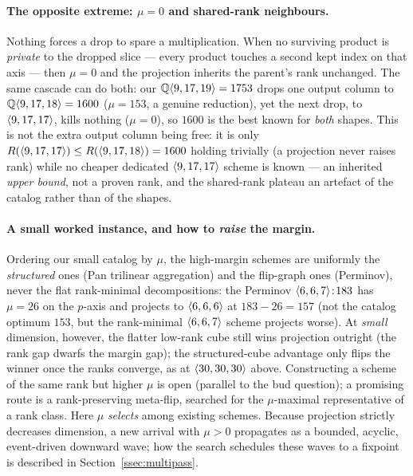 \paragraph{The opposite extreme: \(\mu=0\) and shared-rank neighbours.} Nothing forces a
drop to spare a multiplication. When no surviving product is \emph{private} to the dropped
slice --- every product touches a second kept index on that axis --- then \(\mu=0\) and the
projection inherits the parent's rank unchanged. The same cascade can do both: our
\(\mathbb{Q}\langle 9, 17, 19 \rangle=1753\) drops one output column to
\(\mathbb{Q}\langle 9, 17, 18 \rangle=1600\) (\(\mu=153\), a genuine reduction), yet the next
drop, to \(\langle 9, 17, 17 \rangle\), kills nothing (\(\mu=0\)), so \(1600\) is the best known
for \emph{both} shapes. This is not the extra output column being free: it is only
\(R(\langle 9, 17, 17 \rangle)\le R(\langle 9, 17, 18 \rangle)=1600\) holding trivially (a projection
never raises rank) while no cheaper dedicated \(\langle 9, 17, 17 \rangle\) scheme is known --- an
inherited \emph{upper bound}, not a proven rank, and the shared-rank plateau an artefact of
the catalog rather than of the shapes.

\paragraph{A small worked instance, and how to \emph{raise} the margin.} Ordering our
small catalog by \(\mu\), the high-margin schemes are uniformly the \emph{structured} ones
(Pan trilinear aggregation) and the flip-graph ones (Perminov), never the flat rank-minimal
decompositions: the Perminov \(\langle 6, 6, 7 \rangle\!:\!183\) has \(\mu=26\) on the \(p\)-axis
and projects to \(\langle 6, 6, 6 \rangle\) at \(183-26=157\) (not the catalog optimum \(153\),
but the rank-minimal \(\langle 6, 6, 7 \rangle\) scheme projects worse). At \emph{small}
dimension, however, the flatter low-rank cube still wins projection outright (the rank gap
dwarfs the margin gap); the structured-cube advantage only flips the winner once the ranks
converge, as at \(\langle 30, 30, 30 \rangle\) above. Constructing a scheme of the same rank but
higher \(\mu\) is open (parallel to the bud question); a promising route is a
rank-preserving meta-flip, searched for the \(\mu\)-maximal representative of a rank class.
Here \(\mu\) \emph{selects} among existing schemes. Because projection strictly decreases
dimension, a new arrival with \(\mu>0\) propagates as a bounded, acyclic, event-driven
downward wave; how the search schedules these waves to a fixpoint is described in
Section~\ref{ssec:multipass}.

